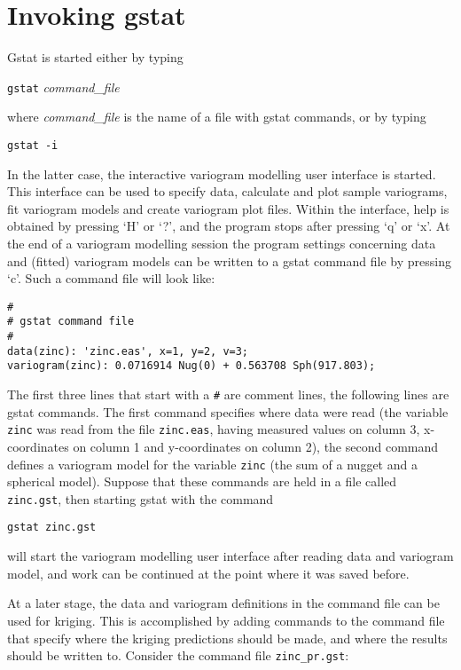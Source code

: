 \documentclass[a4paper,12pt]{book}
\begin{document}
\section{Invoking gstat}
\label{sec:gstat}

Gstat is started either by typing 

{\tt gstat} {\em command\_file}

\noindent
where {\em command\_file} is the name of a file with gstat commands,
or by typing

{\tt gstat -i}

\noindent
In the latter case, the interactive variogram modelling user interface
is started. This interface can be used to specify data, calculate
and plot sample variograms, fit variogram models and create variogram
plot files. Within the interface, help is obtained by pressing `H' or
`?', and the program stops after pressing `q' or `x'. At the end of a
variogram modelling session the program settings concerning data and
(fitted) variogram models can be written to a gstat command file by
pressing `c'. Such a command file will look like:

\begin{verbatim}
#
# gstat command file
#
data(zinc): 'zinc.eas', x=1, y=2, v=3;
variogram(zinc): 0.0716914 Nug(0) + 0.563708 Sph(917.803);
\end{verbatim}

The first three lines that start with a \verb|#| are comment lines,
the following lines are gstat commands. The first command specifies
where data were read (the variable {\tt zinc} was read from the file
{\tt zinc.eas}, having measured values on column 3, x-coordinates on
column 1 and y-coordinates on column 2), the second command defines a
variogram model for the variable {\tt zinc} (the sum of a nugget and a
spherical model). Suppose that these commands are held in a file called
{\tt zinc.gst}, then starting gstat with the command

{\tt gstat zinc.gst}

\noindent
will start the variogram modelling user interface after reading data
and variogram model, and work can be continued at the point where it
was saved before.

At a later stage, the data and variogram definitions in the command
file can be used for kriging. This is accomplished by adding commands
to the command file that specify where the kriging predictions should
be made, and where the results should be written to. Consider the command
file \verb|zinc_pr.gst|:
\end{document}
